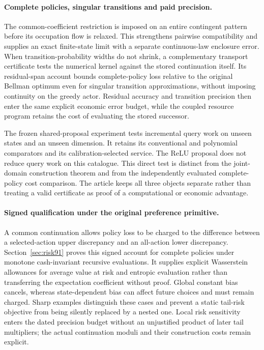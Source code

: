 \documentclass[ecta,nameyear,draft]{econsocart}
\begin{document}
\paragraph{Complete policies, singular transitions and paid precision.}
The common-coefficient restriction is imposed on an entire contingent pattern before its occupation flow is relaxed. This strengthens pairwise compatibility and supplies an exact finite-state limit with a separate continuous-law enclosure error. When transition-probability widths do not shrink, a complementary transport certificate tests the numerical kernel against the stored continuation itself. Its residual-span account bounds complete-policy loss relative to the original Bellman optimum even for singular transition approximations, without imposing continuity on the greedy actor. Residual accuracy and transition precision then enter the same explicit economic error budget, while the coupled resource program retains the cost of evaluating the stored successor.

The frozen shared-proposal experiment tests incremental query work on unseen states and an unseen dimension. It retains its conventional and polynomial comparators and its calibration-selected service. The ReLU proposal does not reduce query work on this catalogue. This direct test is distinct from the joint-domain construction theorem and from the independently evaluated complete-policy cost comparison. The article keeps all three objects separate rather than treating a valid certificate as proof of a computational or economic advantage.

\paragraph{Signed qualification under the original preference primitive.}
A common continuation allows policy loss to be charged to the difference between a selected-action upper discrepancy and an all-action lower discrepancy. Section~\ref{sec:risk91} proves this signed account for complete policies under monotone cash-invariant recursive evaluations. It supplies explicit Wasserstein allowances for average value at risk and entropic evaluation rather than transferring the expectation coefficient without proof. Global constant bias cancels, whereas state-dependent bias can affect future choices and must remain charged. Sharp examples distinguish these cases and prevent a static tail-risk objective from being silently replaced by a nested one. Local risk sensitivity enters the dated precision budget without an unjustified product of later tail multipliers; the actual continuation moduli and their construction costs remain explicit.
\end{document}
